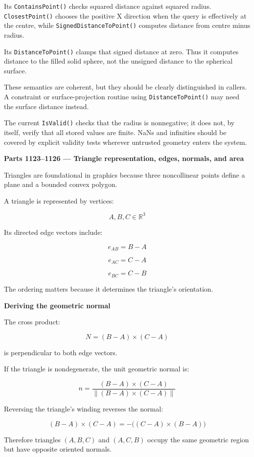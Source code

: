 Its \texttt{ContainsPoint()} checks squared distance against squared radius. \texttt{ClosestPoint()} chooses the positive X direction when the query is effectively at the centre, while \texttt{SignedDistanceToPoint()} computes distance from centre minus radius.

Its \texttt{DistanceToPoint()} clamps that signed distance at zero. Thus it computes distance to the filled solid sphere, not the unsigned distance to the spherical surface.

These semantics are coherent, but they should be clearly distinguished in callers. A constraint or surface-projection routine using \texttt{DistanceToPoint()} may need the surface distance instead.

The current \texttt{IsValid()} checks that the radius is nonnegative; it does not, by itself, verify that all stored values are finite. NaNs and infinities should be covered by explicit validity tests wherever untrusted geometry enters the system.

\textbf{Parts 1123--1126 --- Triangle representation, edges, normals, and area}

Triangles are foundational in graphics because three noncollinear points define a plane and a bounded convex polygon.

A triangle is represented by vertices:

\[
A,B,C\in\mathbb R^3
\]

Its directed edge vectors include:

\[
e_{AB}=B-A
\]

\[
e_{AC}=C-A
\]

\[
e_{BC}=C-B
\]

The ordering matters because it determines the triangle's orientation.

\textbf{Deriving the geometric normal}

The cross product:

\[
N=(B-A)\times(C-A)
\]

is perpendicular to both edge vectors.

If the triangle is nondegenerate, the unit geometric normal is:

\[
\boxed{ n=\frac{(B-A)\times(C-A)} {\|(B-A)\times(C-A)\|} }
\]

Reversing the triangle's winding reverses the normal:

\[
(B-A)\times(C-A) = -\big((C-A)\times(B-A)\big)
\]

Therefore triangles \((A,B,C)\) and \((A,C,B)\) occupy the same geometric region but have opposite oriented normals.

